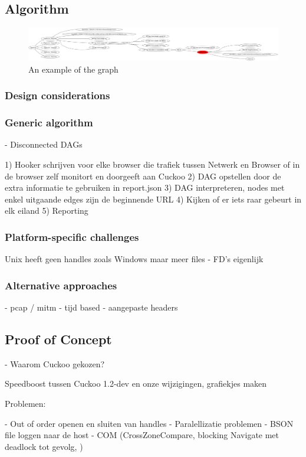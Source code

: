 \subsection{Algorithm}

\begin{figure}[h]
    \centering
    \includegraphics[width=17cm]{Images/alg_tree.png}
    \caption{An example of the graph}
    \label{fig:alg_tree}
\end{figure}

\subsubsection{Design considerations}

\subsubsection{Generic algorithm}

- Disconnected DAGs

1) Hooker schrijven voor elke browser die trafiek tussen Netwerk en Browser of in de browser zelf monitort en doorgeeft aan Cuckoo
2) DAG opstellen door de extra informatie te gebruiken in report.json
3) DAG interpreteren, nodes met enkel uitgaande edges zijn de beginnende URL
4) Kijken of er iets raar gebeurt in elk eiland
5) Reporting

\subsubsection{Platform-specific challenges}

Unix heeft geen handles zoals Windows maar meer files
	- FD's eigenlijk

\subsubsection{Alternative approaches}

- pcap / mitm
- tijd based
- aangepaste headers

\subsection{Proof of Concept}
- Waarom Cuckoo gekozen?

Speedboost tussen Cuckoo 1.2-dev en onze wijzigingen, grafiekjes maken

Problemen:

- Out of order openen en sluiten van handles 
- Paralellizatie problemen
- BSON file loggen naar de host
- COM (CrossZoneCompare, blocking Navigate met deadlock tot gevolg, )